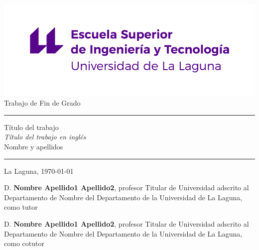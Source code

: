 \documentclass[a4paper,12pt,oneside]{scrbook}
\begin{document}
   

\pagestyle{empty}

\newcommand{\HRule}{\rule{\linewidth}{1mm}}
\setlength{\parindent}{0mm}
\setlength{\parskip}{0mm}


\begin{center}
\includegraphics[scale=0.8]{images/escuela-ingenieria-tecnologia-original}\\[10mm]
{\Huge Trabajo de Fin de Grado}
\end{center}

\HRule
\begin{flushright}
        {\Huge Título del trabajo} \\[2.5mm]
        {\Large \textit{Título del trabajo en inglés}} \\[5mm]
        {\Large Nombre y apellidos} \\[5mm]


\end{flushright}
\HRule
{}
\begin{center}
  \Large La Laguna, \today
\end{center}

\setlength{\parindent}{5mm}

\frontmatter
{}
\thispagestyle{empty}

D. \textbf{Nombre Apellido1 Apellido2}, profesor Titular de Universidad adscrito al Departamento de Nombre del Departamento de la Universidad de La Laguna, como tutor

\bigskip
D. \textbf{Nombre Apellido1 Apellido2}, profesor Titular de Universidad adscrito al Departamento de Nombre del Departamento de la Universidad de La Laguna, como cotutor\pagestyle{empty}
\end{document}
